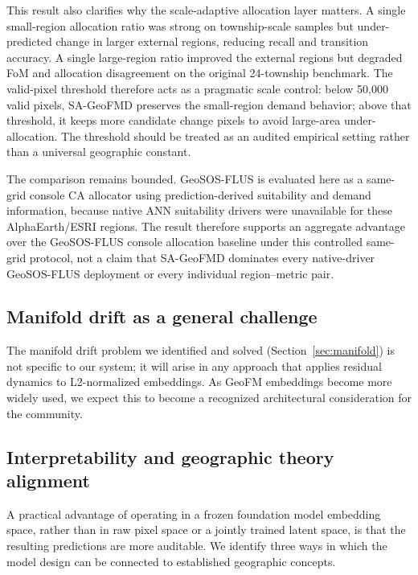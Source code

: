 \documentclass{article}
\begin{document}
This result also clarifies why the scale-adaptive allocation layer matters. A single small-region allocation ratio was strong on township-scale samples but under-predicted change in larger external regions, reducing recall and transition accuracy. A single large-region ratio improved the external regions but degraded FoM and allocation disagreement on the original 24-township benchmark. The valid-pixel threshold therefore acts as a pragmatic scale control: below 50{,}000 valid pixels, SA-GeoFMD preserves the small-region demand behavior; above that threshold, it keeps more candidate change pixels to avoid large-area under-allocation. The threshold should be treated as an audited empirical setting rather than a universal geographic constant.

The comparison remains bounded. GeoSOS-FLUS is evaluated here as a same-grid console CA allocator using prediction-derived suitability and demand information, because native ANN suitability drivers were unavailable for these AlphaEarth/ESRI regions. The result therefore supports an aggregate advantage over the GeoSOS-FLUS console allocation baseline under this controlled same-grid protocol, not a claim that SA-GeoFMD dominates every native-driver GeoSOS-FLUS deployment or every individual region--metric pair.

\subsection{Manifold drift as a general challenge}

The manifold drift problem we identified and solved (Section~\ref{sec:manifold}) is not specific to our system; it will arise in any approach that applies residual dynamics to L2-normalized embeddings. As GeoFM embeddings become more widely used, we expect this to become a recognized architectural consideration for the community.

\subsection{Interpretability and geographic theory alignment}
\label{sec:interpretability}

A practical advantage of operating in a frozen foundation model embedding space, rather than in raw pixel space or a jointly trained latent space, is that the resulting predictions are more auditable. We identify three ways in which the model design can be connected to established geographic concepts.
\end{document}
